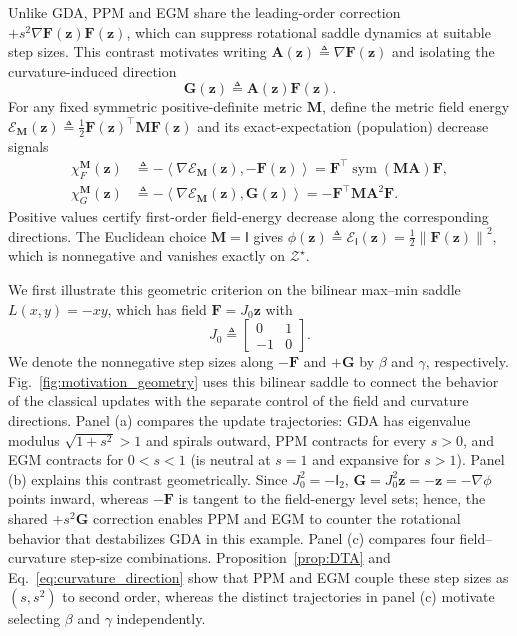 \documentclass{article}
\theoremstyle{remark}
\newcommand{\inner}[2]{\left\langle #1,#2\right\rangle}
\newcommand{\norm}[1]{\left\lVert #1\right\rVert}
\newcommand{\Id}{\mathsf{I}}
\newcommand{\sym}{\operatorname{sym}}
\newcommand{\bz}{\boldsymbol{z}}
\newcommand{\bA}{\boldsymbol{A}}
\newcommand{\bM}{\boldsymbol{M}}
\newcommand{\bF}{\boldsymbol{F}}
\newcommand{\bG}{\boldsymbol{G}}
\newcommand{\cE}{\mathcal{E}}
\begin{document}
Unlike GDA, PPM and EGM share the leading-order correction $+s^{2}\nabla\bF(\bz)\bF(\bz)$, which can suppress rotational saddle dynamics at suitable step sizes.
This contrast motivates writing $\bA(\bz)\triangleq\nabla\bF(\bz)$ and isolating the curvature-induced direction
\begin{equation}\label{eq:curvature_direction}
\bG(\bz)\triangleq\bA(\bz)\bF(\bz).
\end{equation}
For any fixed symmetric positive-definite metric $\bM$, define the metric field energy $\cE_{\bM}(\bz)\triangleq\tfrac12\bF(\bz)^\top\bM\bF(\bz)$ and its exact-expectation (population) decrease signals
\begin{equation}\label{eq:geometry_signals}
\begin{aligned}
\chi_F^{\bM}(\bz)
&\triangleq-\inner{\nabla\cE_{\bM}(\bz)}{-\bF(\bz)}
=\bF^\top\sym(\bM\bA)\bF,\\
\chi_G^{\bM}(\bz)
&\triangleq-\inner{\nabla\cE_{\bM}(\bz)}{\bG(\bz)}
=-\bF^\top\bM\bA^2\bF.
\end{aligned}
\end{equation}
Positive values certify first-order field-energy decrease along the corresponding directions.
The Euclidean choice $\bM=\Id$ gives $\phi(\bz)\triangleq\cE_{\Id}(\bz)=\tfrac12\norm{\bF(\bz)}^{2}$, which is nonnegative and vanishes exactly on $\mathcal Z^\star$.

We first illustrate this geometric criterion on the bilinear max--min saddle $L(x,y)=-xy$, which has field $\bF=J_{0}\bz$ with
\[
J_{0}
\triangleq
\begin{bmatrix}
0&1\\
-1&0
\end{bmatrix}.
\]
We denote the nonnegative step sizes along $-\bF$ and $+\bG$ by $\beta$ and $\gamma$, respectively.
Fig.~\ref{fig:motivation_geometry} uses this bilinear saddle to connect the behavior of the classical updates with the separate control of the field and curvature directions.
Panel (a) compares the update trajectories: GDA has eigenvalue modulus $\sqrt{1+s^{2}}>1$ and spirals outward, PPM contracts for every $s>0$, and EGM contracts for $0<s<1$ (is neutral at $s=1$ and expansive for $s>1$).
Panel (b) explains this contrast geometrically.
Since $J_{0}^{2}=-\Id_{2}$, $\bG=J_0^2\bz=-\bz=-\nabla\phi$ points inward, whereas $-\bF$ is tangent to the field-energy level sets; hence, the shared $+s^{2}\bG$ correction enables PPM and EGM to counter the rotational behavior that destabilizes GDA in this example.
Panel (c) compares four field--curvature step-size combinations.
Proposition~\ref{prop:DTA} and Eq.~\eqref{eq:curvature_direction} show that PPM and EGM couple these step sizes as $(s,s^2)$ to second order, whereas the distinct trajectories in panel (c) motivate selecting $\beta$ and $\gamma$ independently.
\end{document}
